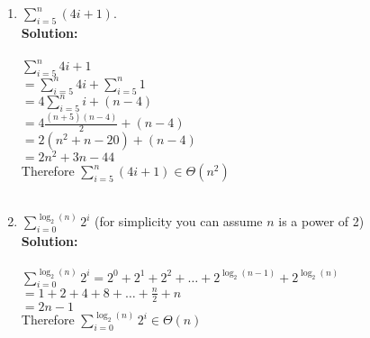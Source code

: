 \documentclass[12pt]{elsart}
\begin{document}
\begin{enumerate}
\item $\sum\limits_{i=5}^{n} (4i+1). $\\
	{\bf Solution:}\\\\
	$\sum\limits_{i=5}^{n} 4i+1 $\\
	$= \sum\limits_{i=5}^{n} 4i + \sum\limits_{i=5}^{n} 1$\\
	$= 4 \sum\limits_{i=5}^{n} i + (n-4)$\\
	$= 4\frac{(n+5)(n-4)}{2} + (n-4)$\\
	$= 2(n^2+n-20) + (n-4)$\\
	$= 2n^2+3n-44$\\
	Therefore $\sum\limits_{i=5}^{n} (4i+1)\in \Theta(n^2)$\\\\

\newpage

\item $\sum\limits_{i=0}^{ \log_2 (n) } 2^i$  (for simplicity you can assume $n$ is a power of 2)
	\\{\bf Solution:}\\\\
	$\sum\limits_{i=0}^{ \log_2 (n) } 2^i = 2^0+2^1+2^2+\ldots+2^{\log_2(n-1)}+2^{\log_2(n)}$\\
	$= 1+2+4+8+\ldots+\frac{n}{2}+n$\\
	$= 2n-1$\\
	Therefore $\sum\limits_{i=0}^{ \log_2 (n) } 2^i \in \Theta(n)$\\
\end{enumerate}
\end{document}
